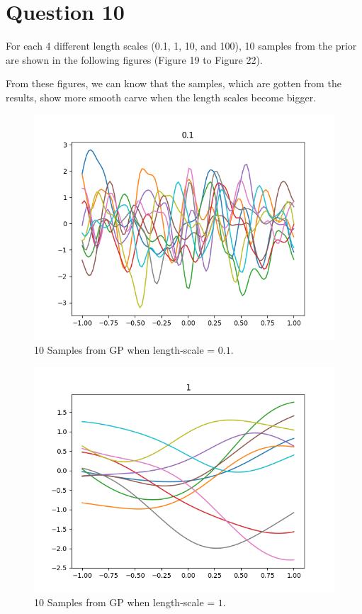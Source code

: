 \documentclass[12pt,letterpaper]{article}
\begin{document}
\clearpage

\section*{Question 10}
For each 4 different length scales (0.1, 1, 10, and 100),
10 samples from the prior are shown in the following figures
(Figure 19 to Figure 22).

From these figures,
we can know that 
the samples, which are gotten from the results, show more smooth carve
when the length scales become bigger.


\begin{figure}[htb]
\centering
\includegraphics[scale =0.5]{Q10_01.png} 
\caption{10 Samples from GP when length-scale = $0.1$.}
\end{figure}
\begin{figure}[htb]
\centering
\includegraphics[scale =0.5]{Q10_1.png} 
\caption{10 Samples from GP when length-scale = $1$.}
\end{figure}
\end{document}
